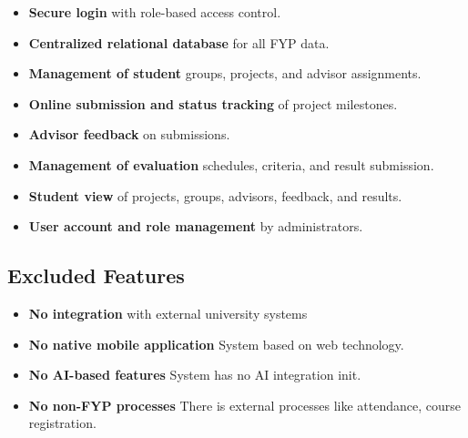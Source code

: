 \documentclass[12pt,a4paper]{report}
\begin{document}
    \begin{itemize}
        \item \textbf{Secure login} with role-based access control.
        
        \item \textbf{Centralized relational database} for all FYP data.
        
        \item \textbf{Management of student }groups, projects, and advisor assignments.
        
        \item \textbf{Online submission and status tracking} of project milestones.
        
        \item \textbf{Advisor feedback} on submissions.
    \end{itemize}


    \begin{itemize}
        \item \textbf{Management of evaluation} schedules, criteria, and result submission.
        
        \item \textbf{Student view} of projects, groups, advisors, feedback, and results.
        
        \item \textbf{User account and role management} by administrators.
        
    \end{itemize}


\subsection{Excluded Features}

\begin{itemize}
    \item \textbf{No integration} with external university systems 
    
    \item \textbf{No native mobile application} System based on web technology.
    
    \item \textbf{No AI-based features} System has no AI integration init.
    
    \item \textbf{No non-FYP processes} There is external processes like attendance, course registration.
    
\end{itemize}
\end{document}
